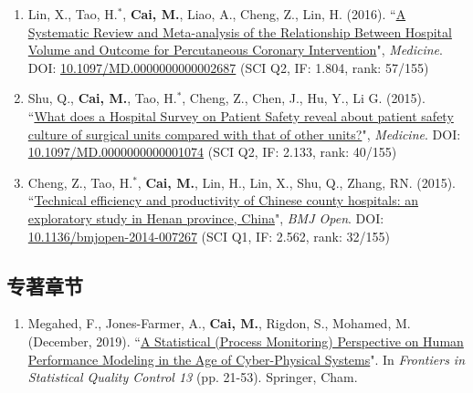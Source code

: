 \documentclass[11pt, a4paper]{article}
\newcommand{\years}[1]{\marginnote{\scriptsize #1}}
\begin{document}
\begin{enumerate}[leftmargin=0ex,itemsep=1ex]
		\item Lin, X., Tao, H.$^\ast$, \textbf{Cai, M.}, Liao, A., Cheng, Z., Lin, H. (2016). ``\ul{A Systematic Review and Meta-analysis of the Relationship Between Hospital Volume and Outcome for Percutaneous Coronary Intervention}", \emph{Medicine}. DOI: \href{https://doi.org/10.1097/MD.0000000000002687}{10.1097/MD.0000000000002687} (SCI Q2, IF: 1.804, rank: 57/155)
		
		\item \years{2015}Shu, Q., \textbf{Cai, M.}, Tao, H.$^\ast$, Cheng, Z., Chen, J., Hu, Y., Li G. (2015). ``\ul{What does a Hospital Survey on Patient Safety reveal about patient safety culture of surgical units compared with that of other units?}", \emph{Medicine}. DOI: \href{https://doi.org/10.1097/MD.0000000000001074}{10.1097/MD.0000000000001074} (SCI Q2, IF: 2.133, rank: 40/155)
		
		\item \years{2015}Cheng, Z., Tao, H.$^\ast$, \textbf{Cai, M.}, Lin, H., Lin, X., Shu, Q., Zhang, RN. (2015). ``\ul{Technical efficiency and productivity of Chinese county hospitals: an exploratory study in Henan province, China}", \emph{BMJ Open}. DOI: \href{https://doi.org/10.1136/bmjopen-2014-007267}{10.1136/bmjopen-2014-007267} (SCI Q1, IF: 2.562, rank: 32/155)
	\end{enumerate}
	
	\subsection*{专著章节}
	\begin{enumerate}[leftmargin=0ex,itemsep=1ex]
		\item Megahed, F., Jones-Farmer, A., \textbf{Cai, M.}, Rigdon, S., Mohamed, M. (December, 2019). ``\ul{A Statistical (Process Monitoring) Perspective on Human Performance Modeling in the Age of Cyber-Physical Systems}". In \textit{Frontiers in Statistical Quality Control 13} (pp. 21-53). Springer, Cham.
	\end{enumerate}
	
	
\end{document}
